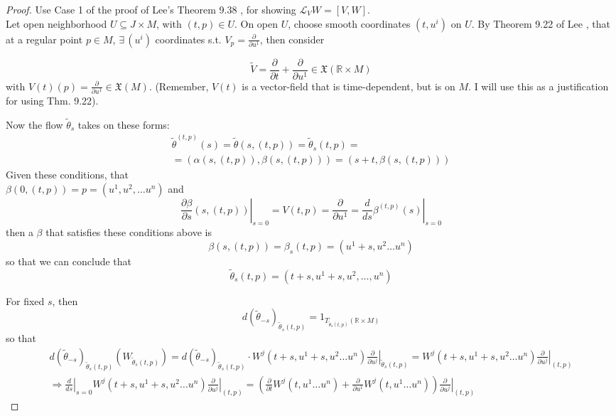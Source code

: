 \documentclass[twoside,landscape,10pt]{amsart}
\theoremstyle{plain}
\theoremstyle{definition}
\theoremstyle{remark}
\theoremstyle{remark}
\begin{document}
\begin{multicols*}{2}
\begin{proof}
Use Case 1 of the proof of Lee's Theorem 9.38 \cite{JLee2012}, for showing $\mathcal{L}_VW = [V,W]$.  \\
Let open neighborhood $U \subseteq J \times M$, with $(t,p) \in U$.  On open $U$, choose smooth coordinates $(t,u^i)$ on $U$.  By Theorem 9.22 of Lee \cite{JLee2012}, that at a regular point $p\in M$, $\exists \, (u^i)$ coordinates s.t. $V_p = \frac{ \partial }{ \partial u^1}$, then consider 

\[
\widetilde{V} = \frac{ \partial }{ \partial t} + \frac{ \partial }{ \partial u^1} \in \mathfrak{X}(\mathbb{R} \times M)
\]
with $V(t)(p) = \frac{ \partial }{ \partial u^1} \in \mathfrak{X}(M)$.  (Remember, $V(t)$ is a vector-field that is time-dependent, but is on $M$.  I will use this as a justification for using Thm. 9.22).  

Now the flow $\widetilde{\theta}_s$ takes on these forms:
\[
\begin{gathered}
  \widetilde{\theta}^{(t,p)}(s) = \widetilde{\theta}(s,(t,p)) = \widetilde{\theta}_s(t,p) = \\
  = (\alpha(s,(t,p)) , \beta(s,(t,p))) = (s+t, \beta(s,(t,p)) )
\end{gathered}
\]
Given these conditions, that \\
$\beta(0,(t,p)) = p = (u^1,u^2, \dots u^n)$ and 
\[
\left. \frac{ \partial \beta}{ \partial s}(s, (t,p)) \right|_{s=0} = V(t,p) = \frac{ \partial }{ \partial u^1} = \left. \frac{d}{ds} \beta^{(t,p)}(s) \right|_{s=0}
\]
then a $\beta$ that satisfies these conditions above is 
\[
\beta(s,(t,p)) = \beta_s(t,p) = (u^1 + s, u^2 \dots u^n)
\]
so that we can conclude that 
\[
\widetilde{\theta}_s(t,p) = (t+s, u^1 + s, u^2 , \dots , u^n)
\]

For fixed $s$, then
\[
d(\widetilde{\theta}_{-s})_{\widetilde{\theta}_s(t,p)} =1_{T_{\widetilde{\theta}_s(t,p)}(\mathbb{R}\times M)}
\]
so that 
\[
\begin{gathered}
  d(\widetilde{\theta}_{-s})_{\widetilde{\theta}_s(t,p)}(W_{\widetilde{\theta}_s(t,p)}) = d(\widetilde{\theta}_{-s})_{\widetilde{\theta}_s(t,p)} \cdot W^j(t+s,u^1 +s, u^2 \dots u^n) \left. \frac{ \partial }{ \partial u^j} \right|_{\widetilde{\theta}_s(t,p)} = W^j(t+s,u^1+s, u^2 \dots u^n) \left. \frac{ \partial }{ \partial u^j} \right|_{(t,p)} \\
\Longrightarrow \left. \frac{d}{ds} \right|_{s=0} W^j(t+s,u^1+s, u^2 \dots u^n) \left. \frac{ \partial }{ \partial u^j} \right|_{(t,p)} = \left( \frac{\partial }{ \partial t} W^j(t,u^1 \dots u^n) + \frac{ \partial }{ \partial u^1 } W^j(t,u^1 \dots u^n) \right) \left. \frac{ \partial}{ \partial u^j} \right|_{(t,p)}
\end{gathered}
\]



\end{proof}
\end{multicols*}
\end{document}
